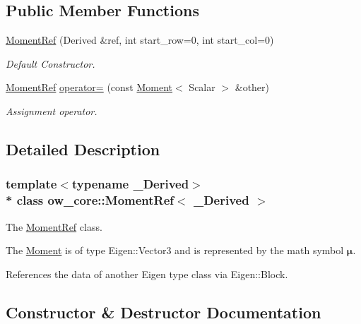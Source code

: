 \subsection*{Public Member Functions}
\begin{DoxyCompactItemize}
\item 
\hyperlink{classow__core_1_1MomentRef_aa806936c7f4f2ae236bc974e0edbd89f}{Moment\+Ref} (Derived \&ref, int start\+\_\+row=0, int start\+\_\+col=0)
\begin{DoxyCompactList}\small\item\em Default Constructor. \end{DoxyCompactList}\item 
\hyperlink{classow__core_1_1MomentRef}{Moment\+Ref} \hyperlink{classow__core_1_1MomentRef_aa7f690d77e9b0ac41095899777692008}{operator=} (const \hyperlink{classow__core_1_1Moment}{Moment}$<$ Scalar $>$ \&other)\hypertarget{classow__core_1_1MomentRef_aa7f690d77e9b0ac41095899777692008}{}\label{classow__core_1_1MomentRef_aa7f690d77e9b0ac41095899777692008}

\begin{DoxyCompactList}\small\item\em Assignment operator. \end{DoxyCompactList}\end{DoxyCompactItemize}


\subsection{Detailed Description}
\subsubsection*{template$<$typename \+\_\+\+Derived$>$\\*
class ow\+\_\+core\+::\+Moment\+Ref$<$ \+\_\+\+Derived $>$}

The \hyperlink{classow__core_1_1MomentRef}{Moment\+Ref} class. 

The \hyperlink{classow__core_1_1Moment}{Moment} is of type Eigen\+::\+Vector3 and is represented by the math symbol $\mathbf{\mu}$.

References the data of another Eigen type class via Eigen\+::\+Block. 

\subsection{Constructor \& Destructor Documentation}
